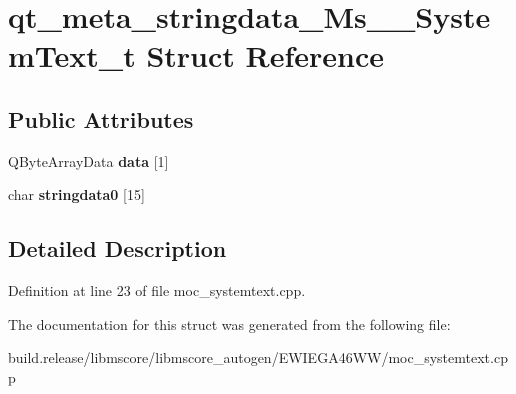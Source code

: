 \hypertarget{structqt__meta__stringdata___ms_____system_text__t}{}\section{qt\+\_\+meta\+\_\+stringdata\+\_\+\+Ms\+\_\+\+\_\+\+System\+Text\+\_\+t Struct Reference}
\label{structqt__meta__stringdata___ms_____system_text__t}
\subsection*{Public Attributes}
\begin{DoxyCompactItemize}
\item 
\mbox{\label{structqt__meta__stringdata___ms_____system_text__t_aba09e152997179c7265a6bc3a0fd3214}} 
Q\+Byte\+Array\+Data {\bfseries data} \mbox{[}1\mbox{]}
\item 
\mbox{\label{structqt__meta__stringdata___ms_____system_text__t_ab949dcd2a6e70f78a45f75ca7364947f}} 
char {\bfseries stringdata0} \mbox{[}15\mbox{]}
\end{DoxyCompactItemize}


\subsection{Detailed Description}


Definition at line 23 of file moc\+\_\+systemtext.\+cpp.



The documentation for this struct was generated from the following file\+:\begin{DoxyCompactItemize}
\item 
build.\+release/libmscore/libmscore\+\_\+autogen/\+E\+W\+I\+E\+G\+A46\+W\+W/moc\+\_\+systemtext.\+cpp\end{DoxyCompactItemize}
